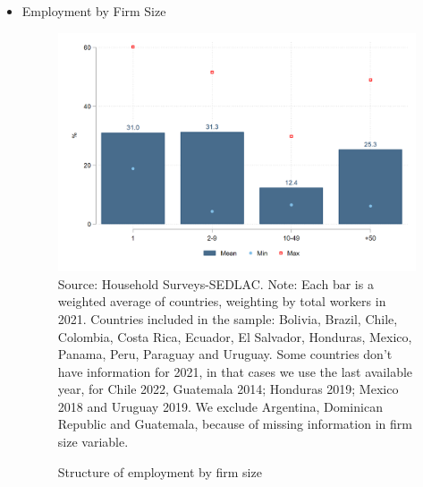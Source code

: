 \documentclass[english]{article}
\begin{document}
\begin{itemize}
        
\item Employment by Firm Size
\begin{figure}[!htb]
        \justifying
        \caption{Structure of employment by firm size}     
        \includegraphics[scale=.3]{latex/figures/Snapshot/Structure of employment by firm size.png}
        \label{fig:firmsize}
        \footnotesize{Source: Household Surveys-SEDLAC.}
        \footnotesize{Note: Each bar is a weighted average of countries, weighting by total workers in 2021. Countries included in the sample: Bolivia, Brazil, Chile, Colombia, Costa Rica, Ecuador, El Salvador, Honduras, Mexico, Panama, Peru, Paraguay and Uruguay. Some countries don’t have information for 2021, in that cases we use the last available year, for Chile 2022, Guatemala 2014; Honduras 2019; Mexico 2018 and Uruguay 2019. We exclude Argentina, Dominican Republic and Guatemala, because of missing information in firm size variable.}
        \end{figure}



\end{itemize}
\end{document}
